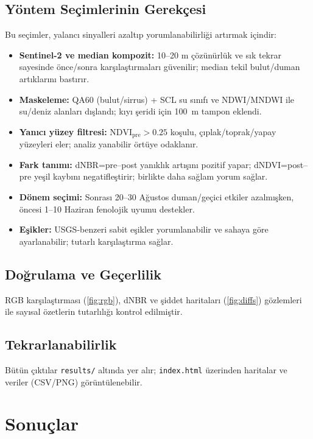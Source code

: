 \documentclass[11pt,a4paper]{article}
\begin{document}
\subsection{Yöntem Seçimlerinin Gerekçesi}
 Bu seçimler, yalancı sinyalleri azaltıp yorumlanabilirliği artırmak içindir:
\begin{itemize}
  \item \textbf{Sentinel-2 ve median kompozit:} 10--20 m çözünürlük ve sık tekrar sayesinde önce/sonra karşılaştırmaları güvenilir; median tekil bulut/duman artıklarını bastırır.
  \item \textbf{Maskeleme:} QA60 (bulut/sirrus) + SCL su sınıfı ve NDWI/MNDWI ile su/deniz alanları dışlandı; kıyı şeridi için \SI{100}{m} tampon eklendi.
  \item \textbf{Yanıcı yüzey filtresi:} \(\mathrm{NDVI}_{\text{pre}}>0.25\) koşulu, çıplak/toprak/yapay yüzeyleri eler; analiz yanabilir örtüye odaklanır.
  \item \textbf{Fark tanımı:} dNBR=pre--post yanıklık artışını pozitif yapar; dNDVI=post--pre yeşil kaybını negatifleştirir; birlikte daha sağlam yorum sağlar.
  \item \textbf{Dönem seçimi:} Sonrası 20--30 Ağustos duman/geçici etkiler azalmışken, öncesi 1--10 Haziran fenolojik uyumu destekler.
  \item \textbf{Eşikler:} USGS-benzeri sabit eşikler yorumlanabilir ve sahaya göre ayarlanabilir; tutarlı karşılaştırma sağlar.
\end{itemize}

\subsection{Doğrulama ve Geçerlilik}
RGB karşılaştırması (\autoref{fig:rgb}), dNBR ve şiddet haritaları (\autoref{fig:diffs}) gözlemleri ile sayısal özetlerin tutarlılığı kontrol edilmiştir. 

\subsection{Tekrarlanabilirlik}
Bütün çıktılar \texttt{results/} altında yer alır; \texttt{index.html} üzerinden haritalar ve veriler (CSV/PNG) görüntülenebilir.
\section{Sonuçlar}
\end{document}
